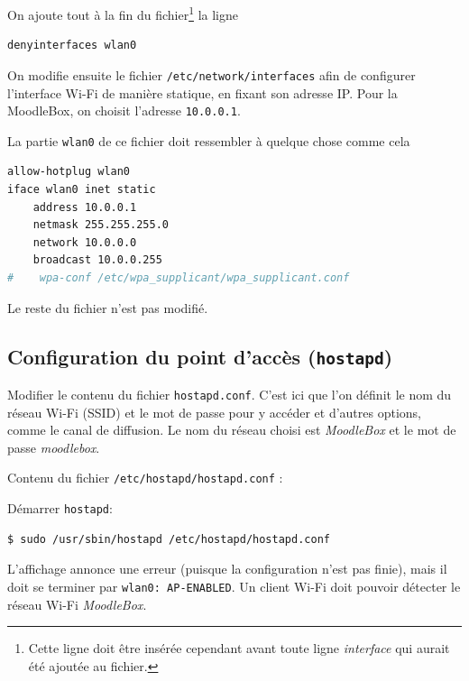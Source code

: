 \documentclass[11pt]{article}
\begin{document}
On ajoute tout à la fin du fichier\footnote{Cette ligne doit être insérée cependant avant toute ligne \emph{interface} qui aurait été ajoutée au fichier.} la ligne
\begin{lstlisting}[language=bash]
denyinterfaces wlan0
\end{lstlisting}

On modifie ensuite le fichier \lstinline{/etc/network/interfaces} afin de configurer l'interface Wi-Fi de manière statique, en fixant son adresse IP. Pour la MoodleBox, on choisit l'adresse \lstinline{10.0.0.1}.

La partie \lstinline{wlan0} de ce fichier doit ressembler à quelque chose comme cela
\begin{lstlisting}[language=bash]
allow-hotplug wlan0
iface wlan0 inet static
    address 10.0.0.1
    netmask 255.255.255.0
    network 10.0.0.0
    broadcast 10.0.0.255
#    wpa-conf /etc/wpa_supplicant/wpa_supplicant.conf
\end{lstlisting}
Le reste du fichier n'est pas modifié.

\subsection[Configuration du point d'accès (\lstinline{hostapd})]{Configuration du point d'accès (\lstinline{hostapd})}

Modifier le contenu du fichier \lstinline{hostapd.conf}. C'est ici que l'on définit le nom du réseau Wi-Fi (SSID) et le mot de passe pour y accéder et d'autres options, comme le canal de diffusion. Le nom du réseau choisi est \emph{MoodleBox} et le mot de passe \emph{moodlebox}.

Contenu du fichier \lstinline{/etc/hostapd/hostapd.conf} :



\begin{verification}
Démarrer \lstinline{hostapd}:
\begin{lstlisting}[language=bash]
$ sudo /usr/sbin/hostapd /etc/hostapd/hostapd.conf
\end{lstlisting}

L'affichage annonce une erreur (puisque la configuration n'est pas finie), mais il doit se terminer par \lstinline{wlan0: AP-ENABLED}. Un client Wi-Fi doit pouvoir détecter le réseau Wi-Fi \emph{MoodleBox}.
\end{verification}
\end{document}
